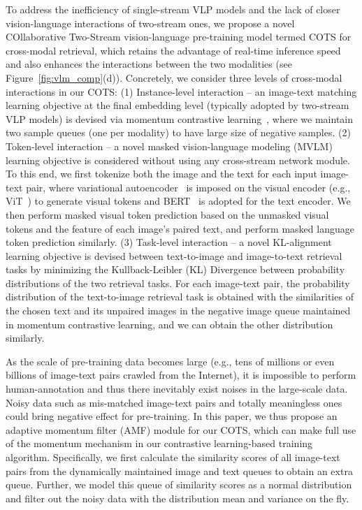 \documentclass[10pt,twocolumn,letterpaper]{article}
\begin{document}
To address the inefficiency of single-stream VLP models and the lack of closer vision-language interactions of two-stream ones, we propose a novel COllaborative Two-Stream vision-language pre-training model termed COTS for cross-modal retrieval, which retains the advantage of real-time inference speed and also enhances the interactions between the two modalities (see Figure~\ref{fig:vlm_comp}(d)). Concretely, we consider three levels of cross-modal interactions in our COTS: (1) Instance-level interaction -- an image-text matching learning objective at the final embedding level (typically adopted by two-stream VLP models) is devised via momentum contrastive learning~\cite{he2020momentum}, where we maintain two sample queues (one per modality) to have large size of negative samples. (2) Token-level interaction -- a novel masked vision-language modeling (MVLM) learning objective is considered without using any cross-stream network module. To this end, we first tokenize both the image and the text for each input image-text pair, where variational autoencoder~\cite{kingma2013auto} is imposed on the visual encoder (e.g., ViT~\cite{dosovitskiy2021an}) to generate visual tokens and BERT~\cite{devlin2018bert} is adopted for the text encoder. We then perform masked visual token prediction based on the unmasked visual tokens and the feature of each image's paired text, and perform masked language token prediction similarly. (3) Task-level interaction -- a novel KL-alignment learning objective is devised between text-to-image and image-to-text retrieval tasks by minimizing the Kullback-Leibler (KL) Divergence between probability distributions of the two retrieval tasks. For each image-text pair, the probability distribution of the text-to-image retrieval task is obtained with the similarities of the chosen text and its unpaired images in the negative image queue maintained in momentum contrastive learning, and we can obtain the other distribution similarly.

As the scale of pre-training data becomes large (e.g., tens of millions or even billions of image-text pairs crawled from the Internet), it is impossible to perform human-annotation and thus there inevitably exist noises in the large-scale data. Noisy data such as mis-matched image-text pairs and totally meaningless ones could bring negative effect for pre-training. In this paper, we thus propose an adaptive momentum filter (AMF) module for our COTS, which can make full use of the momentum mechanism in our contrastive learning-based training algorithm. Specifically, we first calculate the similarity scores of all image-text pairs from the dynamically maintained image and text queues to obtain an extra queue. Further, we model this queue of similarity scores as a normal distribution and filter out the noisy data with the distribution mean and variance on the fly.
\end{document}
